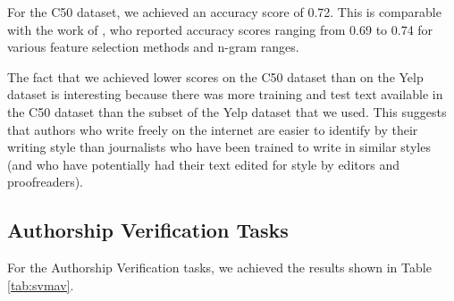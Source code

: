 For the C50 dataset, we achieved an accuracy score of 0.72. This is comparable with the work of \citet{houvardas2006ngram}, who reported accuracy scores ranging from 0.69 to 0.74 for various feature selection methods and n-gram ranges.

The fact that we achieved lower scores on the C50 dataset than on the Yelp dataset is interesting because there was more training and test text available in the C50 dataset than the subset of the Yelp dataset that we used. This suggests that authors who write freely on the internet are easier to identify by their writing style than journalists who have been trained to write in similar styles (and who have potentially had their text edited for style by editors and proofreaders). 

\subsection{Authorship Verification Tasks}
\label{res:svmav}

For the Authorship Verification tasks, we achieved the results shown in Table \ref{tab:svmav}.

